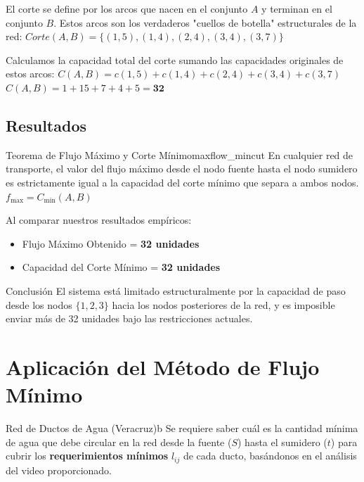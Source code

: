 \documentclass[10pt,a4paper]{article}
\begin{document}
El corte se define por los arcos que nacen en el conjunto $A$ y terminan en el conjunto $B$. Estos arcos son los verdaderos "cuellos de botella" estructurales de la red:
$ Corte(A,B) = \{ (1,5), (1,4), (2,4), (3,4), (3,7) \} $

Calculamos la capacidad total del corte sumando las capacidades originales de estos arcos:
$ C(A,B) = c(1,5) + c(1,4) + c(2,4) + c(3,4) + c(3,7) $
$ C(A,B) = 1 + 15 + 7 + 4 + 5 = \mathbf{32} $

\subsection{Resultados}

\begin{mytheo}{Teorema de Flujo Máximo y Corte Mínimo}{maxflow_mincut}
En cualquier red de transporte, el valor del flujo máximo desde el nodo fuente hasta el nodo sumidero es estrictamente igual a la capacidad del corte mínimo que separa a ambos nodos.
$ f_{\max} = C_{\min}(A,B) $
\end{mytheo}

Al comparar nuestros resultados empíricos:
\begin{itemize}
    \item Flujo Máximo Obtenido = \textbf{32 unidades}
    \item Capacidad del Corte Mínimo = \textbf{32 unidades}
\end{itemize}

\begin{alerta}{Conclusión}
El sistema está limitado estructuralmente por la capacidad de paso desde los nodos 
$\{1,2,3\}$ hacia los nodos posteriores de la red, y es imposible enviar más de 32 unidades bajo 
las restricciones actuales.
\end{alerta}

\newpage

\section{Aplicación del Método de Flujo Mínimo}

\begin{ejercicio}{Red de Ductos de Agua (Veracruz)}{b}
Se requiere saber cuál es la cantidad mínima de agua 
que debe circular en la red desde la fuente
 ($S$) hasta el sumidero ($t$) para cubrir los 
 \textbf{requerimientos mínimos} $l_{ij}$ de cada 
 ducto, basándonos en el análisis del video 
 proporcionado.
\end{ejercicio}
\end{document}
